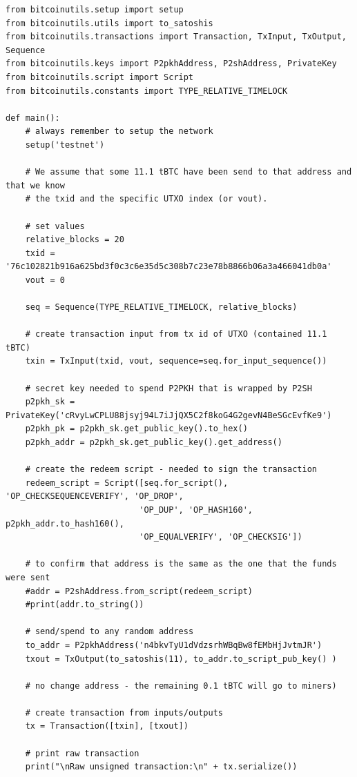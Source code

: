 \vspace{1em}
\begin{lstlisting}[style=Python]
from bitcoinutils.setup import setup
from bitcoinutils.utils import to_satoshis
from bitcoinutils.transactions import Transaction, TxInput, TxOutput, Sequence
from bitcoinutils.keys import P2pkhAddress, P2shAddress, PrivateKey
from bitcoinutils.script import Script
from bitcoinutils.constants import TYPE_RELATIVE_TIMELOCK

def main():
    # always remember to setup the network
    setup('testnet')

    # We assume that some 11.1 tBTC have been send to that address and that we know
    # the txid and the specific UTXO index (or vout).

    # set values
    relative_blocks = 20
    txid = '76c102821b916a625bd3f0c3c6e35d5c308b7c23e78b8866b06a3a466041db0a'
    vout = 0

    seq = Sequence(TYPE_RELATIVE_TIMELOCK, relative_blocks)

    # create transaction input from tx id of UTXO (contained 11.1 tBTC)
    txin = TxInput(txid, vout, sequence=seq.for_input_sequence())

    # secret key needed to spend P2PKH that is wrapped by P2SH
    p2pkh_sk = PrivateKey('cRvyLwCPLU88jsyj94L7iJjQX5C2f8koG4G2gevN4BeSGcEvfKe9')
    p2pkh_pk = p2pkh_sk.get_public_key().to_hex()
    p2pkh_addr = p2pkh_sk.get_public_key().get_address()

    # create the redeem script - needed to sign the transaction
    redeem_script = Script([seq.for_script(), 'OP_CHECKSEQUENCEVERIFY', 'OP_DROP',
                           'OP_DUP', 'OP_HASH160', p2pkh_addr.to_hash160(),
                           'OP_EQUALVERIFY', 'OP_CHECKSIG'])

    # to confirm that address is the same as the one that the funds were sent
    #addr = P2shAddress.from_script(redeem_script)
    #print(addr.to_string())

    # send/spend to any random address
    to_addr = P2pkhAddress('n4bkvTyU1dVdzsrhWBqBw8fEMbHjJvtmJR')
    txout = TxOutput(to_satoshis(11), to_addr.to_script_pub_key() )

    # no change address - the remaining 0.1 tBTC will go to miners)

    # create transaction from inputs/outputs
    tx = Transaction([txin], [txout])

    # print raw transaction
    print("\nRaw unsigned transaction:\n" + tx.serialize())


\end{lstlisting}
